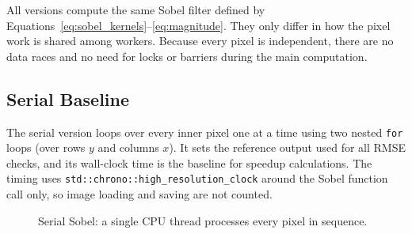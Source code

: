 \documentclass[12pt,a4paper]{article}
\begin{document}
All versions compute the same Sobel filter defined by
Equations~\eqref{eq:sobel_kernels}--\eqref{eq:magnitude}. They only differ
in how the pixel work is shared among workers. Because every pixel is
independent, there are no data races and no need for locks or barriers during
the main computation.

\subsection{Serial Baseline}

The serial version loops over every inner pixel one at a time using two nested
\texttt{for} loops (over rows $y$ and columns $x$). It sets the reference
output used for all RMSE checks, and its wall-clock time is the baseline for
speedup calculations. The timing uses \texttt{std::chrono::high\_resolution\_clock}
around the Sobel function call only, so image loading and saving are not counted.

\begin{figure}[H]
\centering
{}
\caption{Serial Sobel: a single CPU thread processes every pixel in sequence.}
\label{fig:diag_serial}
\end{figure}
\end{document}
